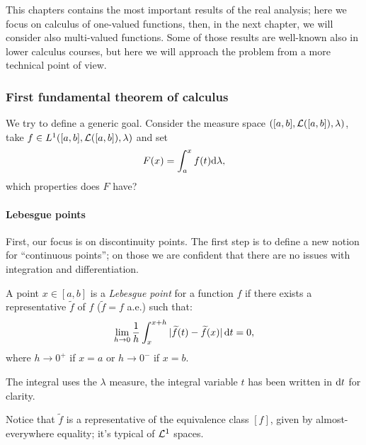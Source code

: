 This chapters contains the most important results of the real analysis; here we focus on calculus of one-valued functions, then, in the next chapter, we will consider also multi-valued functions. Some of those results are well-known also in lower calculus courses, but here we will approach the problem from a more technical point of view.


\subsubsection{First fundamental theorem of calculus}

We try to define a generic goal. Consider the measure space $([a,b],\mathcal L([a,b]),\lambda)$, take $f\in L^1([a,b],\mathcal L([a,b]),\lambda)$ and set 
$$
	F(x) 
	= \int_a^x f(t)\mathrm d \lambda
,
$$
which properties does $F$ have?

\paragraph{Lebesgue points} First, our focus is on discontinuity points. The first step is to define a new notion for ``continuous points''; on those we are confident that there are no issues with integration and differentiation. 
\begin{defn}
A point $x\in[a,b]$ is a \emph{Lebesgue point} for a function $f$ if there exists a representative $\tilde{f}$ of $f$ ($\tilde f = f$ a.e.) such that:
$$
	\lim\limits_{h\to 0}
	\frac 1 h 
	\int_x^{x+h} |\widetilde{f}(t) - \widetilde{f}(x)|\, \mathrm d t 
	= 0
,
$$
where $h \to 0^+$ if $x=a$ or $h \to 0^-$ if $x=b$.
\end{defn}
The integral uses the $\lambda$ measure, the integral variable $t$ has been written in $\mathrm d t$ for clarity.

Notice that $\tilde{f}$ is a representative of the equivalence class $[f]$, given by almost-everywhere equality; it's typical of $\mathcal L^1$ spaces. 

